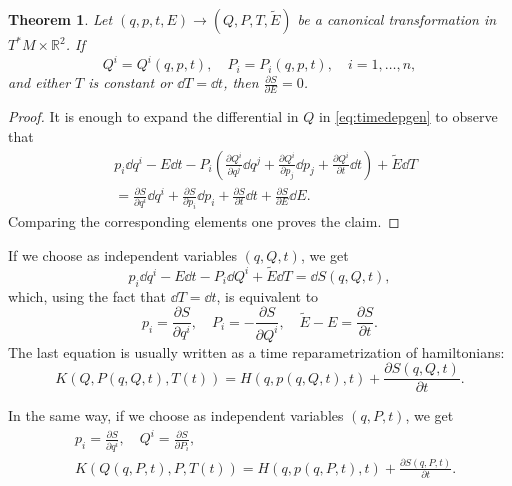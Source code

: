 \documentclass[english,fontsize=11pt,paper=b5]{scrbook}
\numberwithin{equation}{chapter}
\newtheorem{theorem}{Theorem}[chapter]
\theoremstyle{definition}
\begin{document}
    \begin{theorem}\label{thm:Ham0}
      Let $(q,p,t,E) \to (Q,P,T,\widetilde E)$ be a canonical transformation in $T^*M\times \mathbb{R}^2$. If
      \begin{equation}
        Q^i = Q^i(q,p,t), \quad P_i = P_i(q,p,t), \quad i=1,\ldots,n,
      \end{equation}
      and either $T$ is constant or $\dd T = \dd t$, then $\frac{\partial S}{\partial E} = 0$.
    \end{theorem}
    \begin{proof}
      It is enough to expand the differential in $Q$ in \eqref{eq:timedepgen} to observe that
      \begin{align}
     & p_i \dd q^i -E \dd t - P_i \left(
       \frac{\partial Q^i}{\partial q^j}\dd q^j
       +\frac{\partial Q^i}{\partial p_j}\dd p_j
       +\frac{\partial Q^i}{\partial t}\dd t
     \right) + \widetilde E \dd T        \\
     & =
     \frac{\partial S}{\partial q^i}\dd q^i
     +\frac{\partial S}{\partial p_i}\dd p_i
     +\frac{\partial S}{\partial t}\dd t
     +\frac{\partial S}{\partial E}\dd E.
      \end{align}
      Comparing the corresponding elements one proves the claim.
    \end{proof}

    If we choose as independent variables $(q,Q,t)$, we get
    \begin{equation}
      p_i \dd q^i - E \dd t -P_i \dd Q^i + \widetilde E\dd T = \dd S(q,Q,t),
    \end{equation}
    which, using the fact that $\dd T = \dd t$, is equivalent to
    \begin{equation}\label{eq:motionpPEtE}
      p_i = \frac{\partial S}{\partial q^i}, \quad
      P_i = - \frac{\partial S}{\partial Q^i}, \quad
      \widetilde E - E = \frac{\partial S}{\partial t}.
    \end{equation}
    The last equation is usually written as a time reparametrization of hamiltonians:
    \begin{equation}\label{eq:time-reparamqQt}
      K(Q, P(q,Q,t), T(t)) = H(q,p(q,Q,t),t) + \frac{\partial S(q,Q,t)}{\partial t}.
    \end{equation}

    In the same way, if we choose as independent variables $(q,P,t)$, we get
    \begin{align}
   & p_i = \frac{\partial S}{\partial q^i}, \quad Q^i = \frac{\partial S}{\partial P_i},                       \\
   & K(Q(q,P,t), P, T(t)) = H(q, p(q,P,t),t) + \frac{\partial S(q,P,t)}{\partial t}.\label{eq:time-reparamqPt}
    \end{align}
\end{document}
